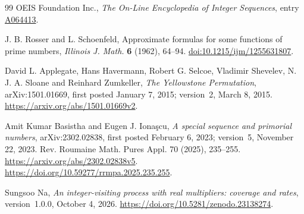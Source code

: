 \documentclass[11pt]{article}
\theoremstyle{definition}
\theoremstyle{remark}
\begin{document}
\begin{thebibliography}{99}
OEIS Foundation Inc., \emph{The On-Line Encyclopedia of Integer Sequences},
entry \href{https://oeis.org/A064413}{A064413}.

J. B. Rosser and L. Schoenfeld, Approximate formulas for some functions
of prime numbers, \emph{Illinois J. Math.} \textbf{6} (1962), 64--94.
\href{https://doi.org/10.1215/ijm/1255631807}{doi:10.1215/ijm/1255631807}.


David L. Applegate, Hans Havermann, Robert G. Selcoe, Vladimir Shevelev,
N. J. A. Sloane and Reinhard Zumkeller,
\emph{The Yellowstone Permutation},
arXiv:1501.01669, first posted January 7, 2015; version~2, March 8, 2015.
\url{https://arxiv.org/abs/1501.01669v2}.

Amit Kumar Basistha and Eugen J. Iona\c{s}cu,
\emph{A special sequence and primorial numbers},
arXiv:2302.02838, first posted February 6, 2023; version~5, November 22, 2023.
Rev. Roumaine Math. Pures Appl. 70 (2025), 235--255.
\url{https://arxiv.org/abs/2302.02838v5}.
\url{https://doi.org/10.59277/rrmpa.2025.235.255}.

Sungsoo Na,
\emph{An integer-visiting process with real multipliers: coverage and rates},
version~1.0.0, October 4, 2026.
\url{https://doi.org/10.5281/zenodo.23138274}.

\end{thebibliography}
\end{document}
